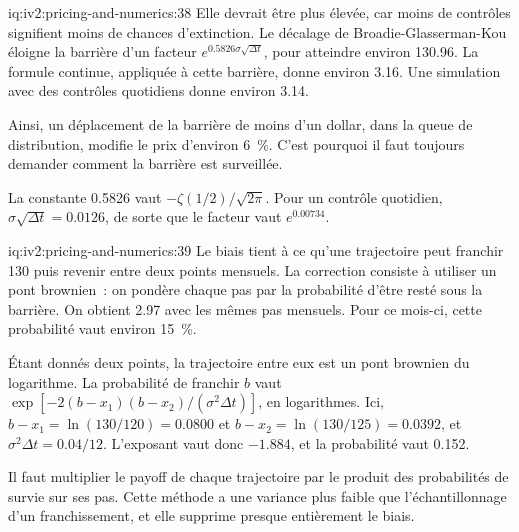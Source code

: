 \begin{solution}{iq:iv2:pricing-and-numerics:38}
Elle devrait être plus élevée, car moins de contrôles signifient moins de chances d'extinction. Le décalage de Broadie-Glasserman-Kou éloigne la barrière d'un facteur $e^{0.5826\sigma\sqrt{\Delta t}}$, pour atteindre environ 130.96. La formule continue, appliquée à cette barrière, donne environ 3.16. Une simulation avec des contrôles quotidiens donne environ 3.14.

Ainsi, un déplacement de la barrière de moins d'un dollar, dans la queue de distribution, modifie le prix d'environ 6~\%. C'est pourquoi il faut toujours demander comment la barrière est surveillée.

La constante 0.5826 vaut $-\zeta(1/2)/\sqrt{2\pi}$. Pour un contrôle quotidien, $\sigma\sqrt{\Delta t} = 0.0126$, de sorte que le facteur vaut $e^{0.00734}$.

\end{solution}

\begin{solution}{iq:iv2:pricing-and-numerics:39}
Le biais tient à ce qu'une trajectoire peut franchir 130 puis revenir entre deux points mensuels. La correction consiste à utiliser un pont brownien~: on pondère chaque pas par la probabilité d'être resté sous la barrière. On obtient 2.97 avec les mêmes pas mensuels. Pour ce mois-ci, cette probabilité vaut environ 15~\%.

Étant donnés deux points, la trajectoire entre eux est un pont brownien du logarithme. La probabilité de franchir $b$ vaut $\exp[-2(b - x_1)(b - x_2)/(\sigma^2\Delta t)]$, en logarithmes. Ici, $b - x_1 = \ln(130/120) = 0.0800$ et $b - x_2 = \ln(130/125) = 0.0392$, et $\sigma^2\Delta t = 0.04/12$. L'exposant vaut donc $-1.884$, et la probabilité vaut 0.152.

Il faut multiplier le payoff de chaque trajectoire par le produit des probabilités de survie sur ses pas. Cette méthode a une variance plus faible que l'échantillonnage d'un franchissement, et elle supprime presque entièrement le biais.

\end{solution}

